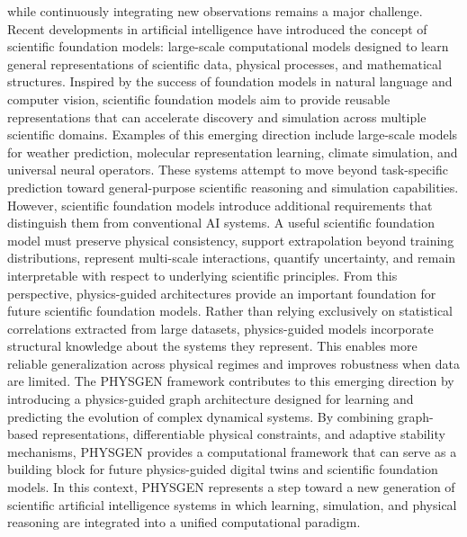 while continuously integrating new observations remains a major challenge. Recent developments in artificial intelligence have introduced the concept of scientific foundation models: large-scale computational models designed to learn general representations of scientific data, physical processes, and mathematical structures. Inspired by the success of foundation models in natural language and computer vision, scientific foundation models aim to provide reusable representations that can accelerate discovery and simulation across multiple scientific domains. Examples of this emerging direction include large-scale models for weather prediction, molecular representation learning, climate simulation, and universal neural operators. These systems attempt to move beyond task-specific prediction toward general-purpose scientific reasoning and simulation capabilities. However, scientific foundation models introduce additional requirements that distinguish them from conventional AI systems. A useful scientific foundation model must preserve physical consistency, support extrapolation beyond training distributions, represent multi-scale interactions, quantify uncertainty, and remain interpretable with respect to underlying scientific principles. From this perspective, physics-guided architectures provide an important foundation for future scientific foundation models. Rather than relying exclusively on statistical correlations extracted from large datasets, physics-guided models incorporate structural knowledge about the systems they represent. This enables more reliable generalization across physical regimes and improves robustness when data are limited. The PHYSGEN framework contributes to this emerging direction by introducing a physics-guided graph architecture designed for learning and predicting the evolution of complex dynamical systems. By combining graph-based representations, differentiable physical constraints, and adaptive stability mechanisms, PHYSGEN provides a computational framework that can serve as a building block for future physics-guided digital twins and scientific foundation models. In this context, PHYSGEN represents a step toward a new generation of scientific artificial intelligence systems in which learning, simulation, and physical reasoning are integrated into a unified computational paradigm. \] 
